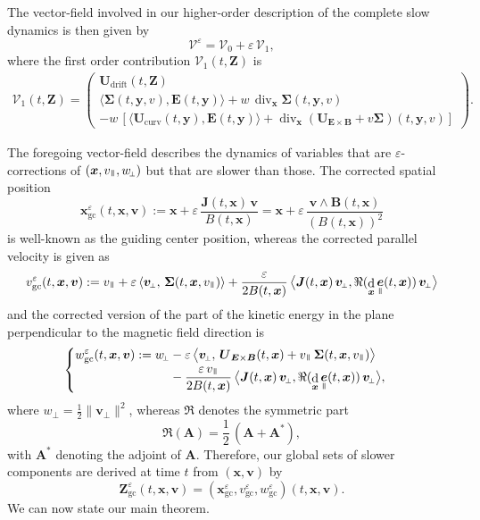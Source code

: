 \documentclass[JEP,XML,SOM,Unicode]{cedram}
\let\mathcal\mathscr
\newenvironment{splitcases}
{\begin{cases}\begin{aligned}}
{\end{aligned}\end{cases}}
\newcommand{\sperp}{{\scriptscriptstyle\perp}}
\newcommand{\blangle}{\bigl\langle}
\newcommand{\brangle}{\bigr\rangle}
\let\eps\varepsilon
\DeclareMathOperator\dD{d}\let\dd\dD
\DeclareMathOperator{\Div}{div}
\theoremstyle{plain}
\theoremstyle{definition}
\newcommand\bp{\begin{pmatrix}}
\newcommand\ep{\end{pmatrix}}
\newcommand{\be}{\begin{equation}}
\newcommand{\ee}{\end{equation}}
\newcommand\bA{{\boldsymbol A}}
\newcommand\bB{{\boldsymbol B}}
\newcommand\bE{{\boldsymbol E}}
\newcommand\bJ{{\boldsymbol J}}
\newcommand\bU{{\boldsymbol U}}
\newcommand\bfv{{\boldsymbol v}}
\newcommand\bfx{{\boldsymbol x}}
\newcommand\bfy{{\boldsymbol y}}
\newcommand\bfZ{{\boldsymbol Z}}
\newcommand\Sig{{\boldsymbol \Sigma}}
\newcommand\cV{{\mathcal V}}
\DeclareMathOperator{\beD}{\boldsymbol{e}}
\newcommand\eDpar{\beD_\mypar}
\newcommand\vpar{v_\mypar}
\newcommand\bvperp{\bfv_{\!\sperp}}
\newcommand\eperp{w_{\!\sperp}}
\let\e w
\newcommand{\GC}{\bfx_\mathrm{gc}}
\newcommand{\eGC}{w_\mathrm{gc}}
\newcommand{\vGC}{v_\mathrm{gc}}
\newcommand{\EcB}{\bU_{\bE\times\bB}}
\newcommand{\curvB}{\bU_{\mathrm{curv}}}
\newcommand{\Ud}{\bU_{\mathrm{drift}}}
\newcommand{\mypar}{{\mkern3mu\vphantom{\perp}\vrule depth 0pt\mkern2mu\vrule depth 0pt\mkern3mu}}
\begin{document}
The vector-field involved in our higher-order description of the complete slow dynamics is then given by
\begin{equation}
\label{V:eps}
\cV^\eps = \cV_0 + \eps\, \cV_1,
\end{equation}
where the first order contribution $\cV_1(t,\bfZ)$ is
\begin{align}
\label{V:1}
\cV_1(t,\bfZ)
= \bp
\Ud(t,\bfZ)
\\
\blangle\Sig(t,\bfy,v),\bE(t,\bfy)\brangle
+\e\,\Div_\bfx\Sig(t,\bfy,v)
\\
 - \e\,\left[\blangle
\curvB(t,\bfy),\bE(t,\bfy)\brangle + \Div_\bfx\left(\EcB+v\Sig\right)(t,\bfy,v)\right]
\ep.
\end{align}

The foregoing vector-field describes the dynamics of variables that are $\eps$-corrections of $(\bfx,\vpar,\eperp)$ but that are slower than those. The corrected spatial position
\be
\label{GC}
\GC^\eps (t,\bfx,\bfv) :=\bfx+\eps\,\frac{\bJ(t,\bfx)\,\bfv}{B(t,\bfx)}
=\bfx+\eps\,\frac{\bfv\wedge \bB(t,\bfx)}{(B(t,\bfx))^2}
\ee
is well-known as the guiding center position, whereas the corrected
parallel velocity is given as\vspace*{-3pt}
\be
\label{vGC}
\vGC^\eps (t,\bfx,\bfv):= \vpar
 +
\eps\,\langle\bvperp,\,\Sig(t,\bfx,\vpar)\rangle
+ \frac{\eps}{2 B(t,\bfx)} \,\blangle\bJ(t,\bfx)\,\bvperp,\Re(\dD_\bfx\eDpar(t,\bfx))\,\bvperp\brangle
\ee
and the corrected version of the part of the kinetic energy in the plane perpendicular to the magnetic field direction is
\be
\label{eGC}
\begin{splitcases}
\eGC^\eps(t,\bfx,\bfv) :=\eperp
&-\eps\,\blangle\bvperp,\,
\EcB(t,\bfx)+\vpar\,\Sig(t,\bfx,\vpar)\brangle
\\
&-\dfrac{\eps\,\vpar}{2B(t,\bfx)} \,\blangle\bJ(t,\bfx)\,\bvperp,\Re(\dD_\bfx\eDpar(t,\bfx))\,\bvperp\brangle,
\end{splitcases}
\ee
where $\eperp=\frac{1}{2}\|\bvperp\|^2$, whereas $\Re$ denotes the symmetric part\vspace*{-3pt}
\be
\label{ReA}
\Re(\bA)=\frac{1}{2}\,(\bA+\bA^*),
\ee
with $\bA^*$ denoting the adjoint of $\bA$.
Therefore, our global sets of slower components are derived at time $t$ from
$(\bfx,\bfv)$ by
\[
\bfZ_\mathrm{gc}^\eps(t,\bfx,\bfv) =(\GC^\eps, \vGC^\eps,
\eGC^\eps)(t,\bfx,\bfv).
\]
We can now state our main theorem.
\end{document}
